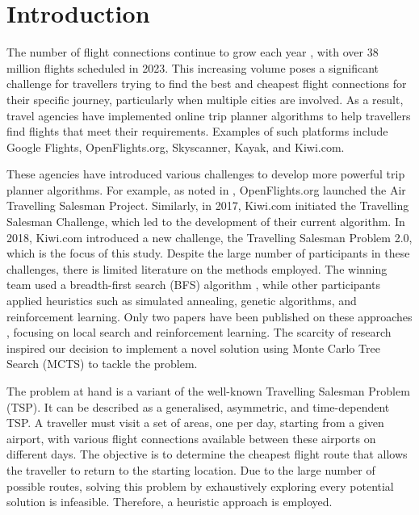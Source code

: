 \section{Introduction}

The number of flight connections continue to grow each year \cite{statista_flights_year}, with over 38 million flights scheduled in 2023. This increasing volume poses a significant challenge for travellers trying to find the best and cheapest flight connections for their specific journey, particularly when multiple cities are involved. As a result, travel agencies have implemented online trip planner algorithms to help travellers find flights that meet their requirements. Examples of such platforms include Google Flights, OpenFlights.org, Skyscanner, Kayak, and Kiwi.com.

These agencies have introduced various challenges to develop more powerful trip planner algorithms. For example, as noted in \cite{reinforcement_learning_yaro}, OpenFlights.org launched the Air Travelling Salesman Project. Similarly, in 2017, Kiwi.com initiated the Travelling Salesman Challenge, which led to the development of their current algorithm. In 2018, Kiwi.com introduced a new challenge, the Travelling Salesman Problem 2.0, which is the focus of this study. Despite the large number of participants in these challenges, there is limited literature on the methods employed. The winning team used a breadth-first search (BFS) algorithm \cite{tsp2_award}, while other participants applied heuristics such as simulated annealing, genetic algorithms, and reinforcement learning. Only two papers have been published on these approaches \cite{reinforcement_learning_yaro,local_search_yaro}, focusing on local search and reinforcement learning. The scarcity of research inspired our decision to implement a novel solution using Monte Carlo Tree Search (MCTS) to tackle the problem.

The problem at hand is a variant of the well-known Travelling Salesman Problem (TSP). It can be described as a generalised, asymmetric, and time-dependent TSP. A traveller must visit a set of areas, one per day, starting from a given airport, with various flight connections available between these airports on different days. The objective is to determine the cheapest flight route that allows the traveller to return to the starting location. Due to the large number of possible routes, solving this problem by exhaustively exploring every potential solution is infeasible. Therefore, a heuristic approach is employed.